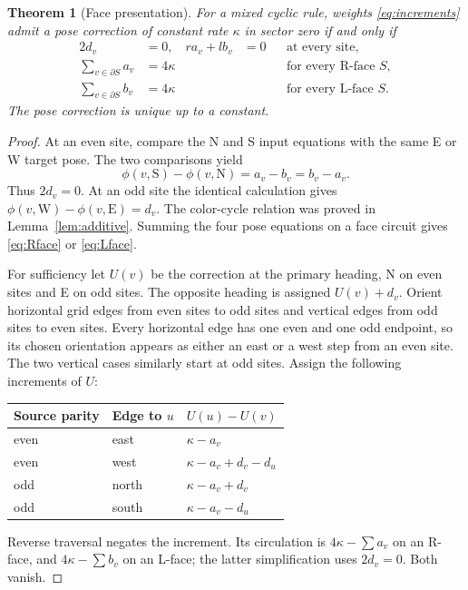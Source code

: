 \documentclass[11pt]{article}
\newtheorem{theorem}{Theorem}[section]
\theoremstyle{definition}
\begin{document}
\begin{theorem}[Face presentation]\label{thm:presentation}
For a mixed cyclic rule, weights \eqref{eq:increments} admit a pose correction
of constant rate $\kappa$ in sector zero if and only if
\begin{align}
 2d_v&=0,&r a_v+l b_v&=0 &&\text{at every site},\label{eq:site}\\
 \sum_{v\in\partial S}a_v&=4\kappa &&&&\text{for every R-face }S,\label{eq:Rface}\\
 \sum_{v\in\partial S}b_v&=4\kappa &&&&\text{for every L-face }S.\label{eq:Lface}
\end{align}
The pose correction is unique up to a constant.
\end{theorem}
\begin{proof}
At an even site, compare the N and S input equations with the same E or W
target pose. The two comparisons yield
\[
 \phi(v,\mathrm S)-\phi(v,\mathrm N)=a_v-b_v=b_v-a_v.
\]
Thus $2d_v=0$. At an odd site the identical calculation gives
$\phi(v,\mathrm W)-\phi(v,\mathrm E)=d_v$. The color-cycle relation was proved
in Lemma~\ref{lem:additive}. Summing the four pose equations on a face circuit
gives \eqref{eq:Rface} or \eqref{eq:Lface}.

For sufficiency let $U(v)$ be the correction at the primary heading, N on
even sites and E on odd sites. The opposite heading is assigned $U(v)+d_v$.
Orient horizontal grid edges from even sites to odd sites and vertical edges
from odd sites to even sites. Every horizontal edge has one even and one odd
endpoint, so its chosen orientation appears as either an east or a west step
from an even site. The two vertical cases similarly start at odd sites.
Assign the following increments of $U$:
\begin{center}
\begin{tabular}{lll}
\toprule
Source parity & Edge to $u$ & $U(u)-U(v)$\\
\midrule
even & east & $\kappa-a_v$\\
even & west & $\kappa-a_v+d_v-d_u$\\
odd & north & $\kappa-a_v+d_v$\\
odd & south & $\kappa-a_v-d_u$\\
\bottomrule
\end{tabular}
\end{center}
Reverse traversal negates the increment. Its circulation is
$4\kappa-\sum a_v$ on an R-face, and $4\kappa-\sum b_v$ on an L-face;
the latter simplification uses $2d_v=0$. Both vanish.


\end{proof}
\end{document}
